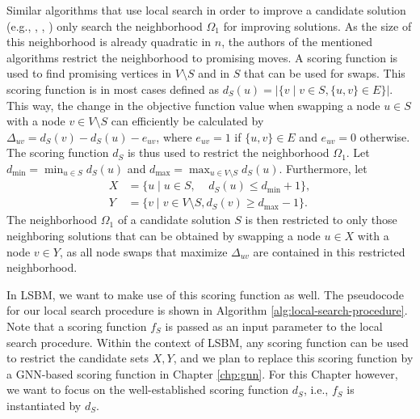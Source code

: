 \documentclass[draft,final]{vutinfth} %
\begin{document}
Similar algorithms that use local search in order to improve a candidate solution (e.g.,  \cite{chen_nuqclq_2021}, \cite{djeddi_extension_2019}, \cite{zhou_opposition-based_2020}) only search the neighborhood $\Omega_1$ for improving solutions. As the size of this neighborhood is already quadratic in $n$, the authors of the mentioned algorithms restrict the neighborhood to promising moves. A scoring function is used to find promising vertices in $V \setminus S$ and in $S$ that can be used for swaps. This scoring function is in most cases defined as $d_S(u) = |\{v \mid v \in S, \{u,v\} \in E \}|$. This way, the change in the objective function value when swapping a node $u \in S$ with a node $v \in V \setminus S$ can efficiently be calculated by $\Delta_{uv} = d_S(v) - d_S(u) - e_{uv}$, where $e_{uv} = 1$ if $\{u,v\} \in E$ and $e_{uv} = 0$ otherwise. 
The scoring function $d_S$ is thus used to restrict the neighborhood $\Omega_1$. 
Let $d_{\min} = \min_{u \in S} d_S(u)$ and $d_{\max} = \max_{u \in V \setminus S} d_S(u)$.
Furthermore, let 
\begin{align*}
    X &= \{ u \mid u \in S,~~~~~ d_S(u) \leq d_{\min} + 1 \}, \\
    Y &= \{ v \mid v \in V \setminus S, d_S(v) \geq d_{\max} - 1 \}.
\end{align*} The neighborhood $\Omega_1$ of a candidate solution $S$ is then restricted to only those neighboring solutions that can be obtained by swapping a node $u \in X$ with a node $v \in Y$, as all node swaps that maximize $\Delta_{uv}$ are contained in this restricted neighborhood. 

In LSBM, we want to make use of this scoring function as well. The pseudocode for our local search procedure is shown in Algorithm \ref{alg:local-search-procedure}. Note that a scoring function $f_S$ is passed as an input parameter to the local search procedure. Within the context of LSBM, any scoring function can be used to restrict the candidate sets $X, Y$, and we plan to replace this scoring function by a GNN-based scoring function in Chapter \ref{chp:gnn}. 
For this Chapter however, we want to focus on the well-established scoring function $d_S$, i.e., $f_S$ is instantiated by $d_S$. 
\end{document}
